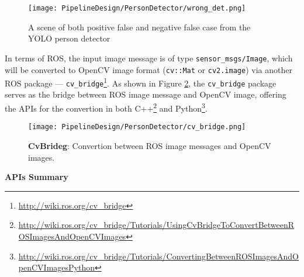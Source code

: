 \begin{figure}[h!]
  \centering
  \texttt{[image: PipelineDesign/PersonDetector/wrong\_det.png]}
  \caption{A scene of both positive false and negative false case from the YOLO person detector} 
  \label{fig:wrong_det}
\end{figure}

In terms of ROS, the input image message is of type \texttt{sensor\_msgs/Image}, which will be converted to OpenCV image format (\texttt{cv::Mat} or \texttt{cv2.image}) via another ROS package --- \texttt{cv\_bridge}\footnote{\url{http://wiki.ros.org/cv_bridge}}. As shown in Figure \ref{fig:cv_bridge}, the \texttt{cv\_bridge} package serves as the bridge between ROS image message and OpenCV image, offering the APIs for the convertion in both C++\footnote{\url{http://wiki.ros.org/cv_bridge/Tutorials/UsingCvBridgeToConvertBetweenROSImagesAndOpenCVImages}} and Python\footnote{\url{
http://wiki.ros.org/cv_bridge/Tutorials/ConvertingBetweenROSImagesAndOpenCVImagesPython}}. 

\begin{figure}[H]
  \centering
  \texttt{[image: PipelineDesign/PersonDetector/cv\_bridge.png]}
  \caption{\textbf{CvBrideg}: Convertion between ROS image messages and OpenCV images. \cite{roscvbridge}}
  \label{fig:cv_bridge}
\end{figure}

\textbf{APIs Summary}

